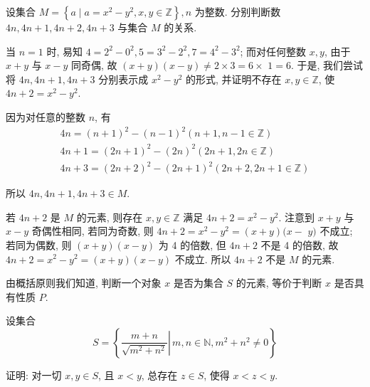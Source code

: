\begin{example}
	设集合 $M=\left\{a \mid a=x^{2}-y^{2}, x, y \in \mathbb{Z}\right\}, n$ 为整数. 分别判断数 $4 n ,  4 n+1 ,  4 n+2 ,  4 n+3$ 与集合 $M$ 的关系.
\end{example}
\begin{analysis}
	当 $n=1$ 时, 易知 $4=2^{2}-0^{2}, 5=3^{2}-2^{2}, 7=4^{2}-3^{2}$; 而对任何整数 $x ,  y$, 由于 $x+y$ 与 $x-y$ 同奇偶, 故 $(x+y)(x-y) \neq 2 \times 3=6 \times$ $1=6$. 于是, 我们尝试将 $4 n ,  4 n+1 ,  4 n+3$ 分别表示成 $x^{2}-y^{2}$ 的形式, 并证明不存在 $x, y \in \mathbb{Z}$, 使 $4 n+2=x^{2}-y^{2}$.
\end{analysis}

\begin{solution}
	因为对任意的整数 $n$, 有
	\begin{gather*}
		4 n=(n+1)^{2}-(n-1)^{2}(n+1, n-1 \in \mathbb{Z}) \\
		4 n+1=(2 n+1)^{2}-(2 n)^{2}(2 n+1,2 n \in \mathbb{Z}) \\
		4 n+3=(2 n+2)^{2}-(2 n+1)^{2}(2 n+2,2 n+1 \in \mathbb{Z})
	\end{gather*}

	所以 $4 n, 4 n+1,4 n+3 \in M$.

	若 $4 n+2$ 是 $M$ 的元素, 则存在 $x, y \in \mathbb{Z}$ 满足 $4 n+2=x^{2}-y^{2}$. 注意到 $x+y$ 与 $x-y$ 奇偶性相同, 若同为奇数, 则 $4 n+2=x^{2}-y^{2}=(x+y)(x-$ $y)$ 不成立; 若同为偶数, 则 $(x+y)(x-y)$ 为 4 的倍数, 但 $4 n+2$ 不是 4 的倍数, 故 $4 n+2=x^{2}-y^{2}=(x+y)(x-y)$ 不成立. 所以 $4 n+2$ 不是 $M$ 的元素.
\end{solution}
\begin{note}
	由概括原则我们知道, 判断一个对象 $x$ 是否为集合 $S$ 的元素, 等价于判断 $x$ 是否具有性质 $P$.
\end{note}
\begin{example}
	设集合
	$$
		S=\left\{\left.\frac{m+n}{\sqrt{m^{2}+n^{2}}} \right\rvert\, m, n \in \mathbb{N}, m^{2}+n^{2} \neq 0\right\}
	$$

	证明: 对一切 $x, y \in S$, 且 $x<y$, 总存在 $z \in S$, 使得 $x<z<y$.
\end{example}

